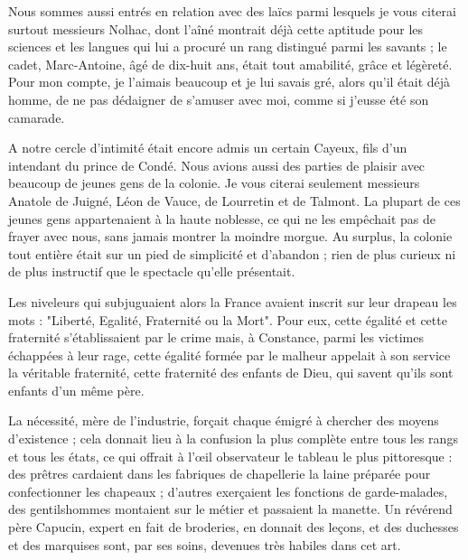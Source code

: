 \documentclass[11pt,a4paper]{report}
\begin{document}
Nous sommes aussi entrés en relation avec des laïcs parmi lesquels je vous citerai surtout messieurs Nolhac, dont l'aîné montrait déjà cette aptitude pour les sciences et les langues qui lui a procuré un rang distingué parmi les savants ; le cadet, Marc-Antoine, âgé de dix-huit ans, était tout amabilité, grâce et légèreté. Pour mon compte, je l'aimais beaucoup et je lui savais gré, alors qu'il était déjà homme, de ne pas dédaigner de s'amuser avec moi, comme si j'eusse été son camarade.

A notre cercle d'intimité était encore admis un certain Cayeux, fils d'un intendant du prince de Condé. Nous avions aussi des parties de plaisir avec beaucoup de jeunes gens de la colonie. Je vous citerai seulement messieurs Anatole de Juigné, Léon de Vauce, de Lourretin et de Talmont. La plupart de ces jeunes gens appartenaient à la haute noblesse, ce qui ne les empêchait pas de frayer avec nous, sans jamais montrer la moindre morgue. Au surplus, la colonie tout entière était sur un pied de simplicité et d'abandon ; rien de plus curieux ni de plus instructif que le spectacle qu'elle présentait.

Les niveleurs qui subjuguaient alors la France avaient inscrit sur leur drapeau les mots : "Liberté, Egalité, Fraternité ou la Mort". Pour eux, cette égalité et cette fraternité s'établissaient par le crime mais, à Constance, parmi les victimes échappées à leur rage, cette égalité formée par le malheur appelait à son service la véritable fraternité, cette fraternité des enfants de Dieu, qui savent qu'ils sont enfants d'un même père.

La nécessité, mère de l'industrie, forçait chaque émigré à chercher des moyens d'existence ; cela donnait lieu à la confusion la plus complète entre tous les rangs et tous les états, ce qui offrait à l'œil observateur le tableau le plus pittoresque : des prêtres cardaient dans les fabriques de chapellerie la laine préparée pour confectionner les chapeaux ; d'autres exerçaient les fonctions de garde-malades, des gentilshommes montaient sur le métier et passaient la manette. Un révérend père Capucin, expert en fait de broderies, en donnait des leçons, et des duchesses et des marquises sont, par ses soins, devenues très habiles dans cet art.
\end{document}
